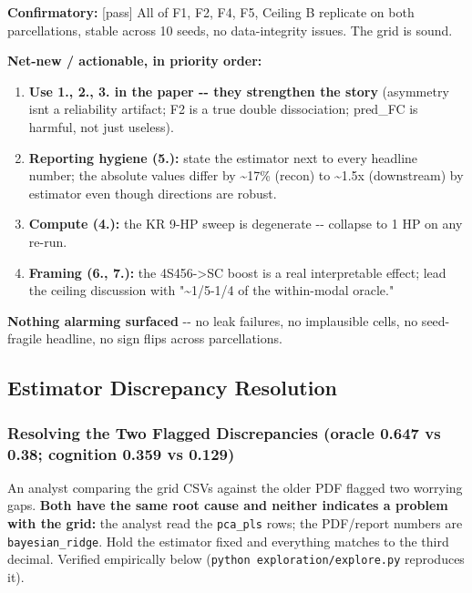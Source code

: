 \textbf{Confirmatory:} {[}pass{]} All of F1, F2, F4, F5, Ceiling B replicate on both parcellations, stable across 10 seeds, no data-integrity issues. The grid is sound.

\textbf{Net-new / actionable, in priority order:}

\begin{enumerate}
\def\labelenumi{\arabic{enumi}.}
\tightlist
\item
  \textbf{Use 1., 2., 3. in the paper -\/- they strengthen the story} (asymmetry isn\textquotesingle t a reliability artifact; F2 is a true double dissociation; pred\_FC is harmful, not just useless).
\item
  \textbf{Reporting hygiene (5.):} state the estimator next to every headline number; the absolute values differ by \textasciitilde17\% (recon) to \textasciitilde1.5x (downstream) by estimator even though directions are robust.
\item
  \textbf{Compute (4.):} the KR 9-HP sweep is degenerate -\/- collapse to 1 HP on any re-run.
\item
  \textbf{Framing (6., 7.):} the 4S456-\textgreater SC boost is a real interpretable effect; lead the ceiling discussion with "\textasciitilde1/5-1/4 of the within-modal oracle."
\end{enumerate}

\textbf{Nothing alarming surfaced} -\/- no leak failures, no implausible cells, no seed-fragile headline, no sign flips across parcellations.

\subsection{Estimator Discrepancy Resolution}\label{estimator-discrepancy-resolution}

\subsubsection{Resolving the Two Flagged Discrepancies (oracle 0.647 vs 0.38; cognition 0.359 vs 0.129)}\label{resolving-the-two-flagged-discrepancies-oracle-0647-vs-038-cognition-0359-vs-0129}

An analyst comparing the grid CSVs against the older PDF flagged two worrying gaps. \textbf{Both have the same root cause and neither indicates a problem with the grid:} the analyst read the \texttt{pca\_pls} rows; the PDF/report numbers are \texttt{bayesian\_ridge}. Hold the estimator fixed and everything matches to the third decimal. Verified empirically below (\texttt{python\ exploration/explore.py} reproduces it).

